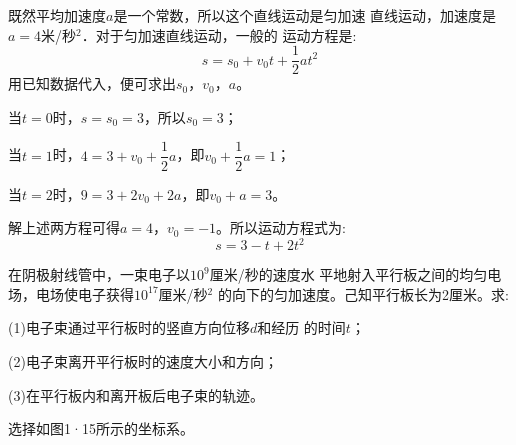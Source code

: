 \noindent 既然平均加速度$a$是一个常数，所以这个直线运动是匀加速
直线运动，加速度是$a=4$米/秒$^2$．对于匀加速直线运动，一般的
运动方程是:
\begin{equation*}
    s=s_0+v_{0}t+\frac{1}{2}at^2
\end{equation*}
用已知数据代入，便可求出$s_0$，$v_0$，$a$。

当$t=0$时，$s=s_0=3$，所以$s_0=3$；

当$t=1$时，$4=3+v_0+\dfrac 1 2 a$，即$v_0+\dfrac 1 2 a=1$；

当$t=2$时，$9=3+2v_0+2a$，即$v_0+a=3$。

解上述两方程可得$a=4$，$v_0=-1$。所以运动方程式为:
\begin{equation*}
    s=3-t+2t^2
\end{equation*}

\example 在阴极射线管中，一束电子以$10^9$厘米/秒的速度水
平地射入平行板之间的均匀电场，电场使电子获得$10^17$厘米/秒$^2$
的向下的匀加速度。己知平行板长为2厘米。求:

(1)电子束通过平行板时的竖直方向位移$d$和经历
的时间$t$；

(2)电子束离开平行板时的速度大小和方向；

(3)在平行板内和离开板后电子束的轨迹。

\solution 选择如图1·15所示的坐标系。

